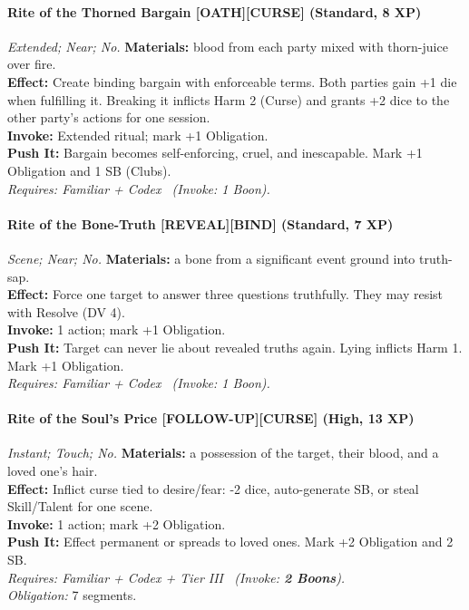 \paragraph{Rite of the Thorned Bargain \textnormal{[OATH][CURSE]} (Standard, 8 XP)} \emph{Extended; Near; No.}
\textbf{Materials:} blood from each party mixed with thorn-juice over fire.\\
\textbf{Effect:} Create binding bargain with enforceable terms. Both parties gain +1 die when fulfilling it. Breaking it inflicts Harm 2 (Curse) and grants +2 dice to the other party's actions for one session.\\
\textbf{Invoke:} Extended ritual; mark +1 Obligation.\\
\textbf{Push It:} Bargain becomes self-enforcing, cruel, and inescapable. Mark +1 Obligation and 1 SB (Clubs).\\
\emph{Requires: Familiar + Codex \ (\textit{Invoke:} 1 Boon).}

\paragraph{Rite of the Bone-Truth \textnormal{[REVEAL][BIND]} (Standard, 7 XP)} \emph{Scene; Near; No.}
\textbf{Materials:} a bone from a significant event ground into truth-sap.\\
\textbf{Effect:} Force one target to answer three questions truthfully. They may resist with Resolve (DV 4).\\
\textbf{Invoke:} 1 action; mark +1 Obligation.\\
\textbf{Push It:} Target can never lie about revealed truths again. Lying inflicts Harm 1. Mark +1 Obligation.\\
\emph{Requires: Familiar + Codex \ (\textit{Invoke:} 1 Boon).}

\paragraph{Rite of the Soul's Price \textnormal{[FOLLOW-UP][CURSE]} (High, 13 XP)} \emph{Instant; Touch; No.}
\textbf{Materials:} a possession of the target, their blood, and a loved one's hair.\\
\textbf{Effect:} Inflict curse tied to desire/fear: -2 dice, auto-generate SB, or steal Skill/Talent for one scene.\\
\textbf{Invoke:} 1 action; mark +2 Obligation.\\
\textbf{Push It:} Effect permanent or spreads to loved ones. Mark +2 Obligation and 2 SB.\\
\emph{Requires: Familiar + Codex + Tier III \ (\textit{Invoke:} \textbf{2 Boons}).}\\
\emph{Obligation:} 7 segments.

